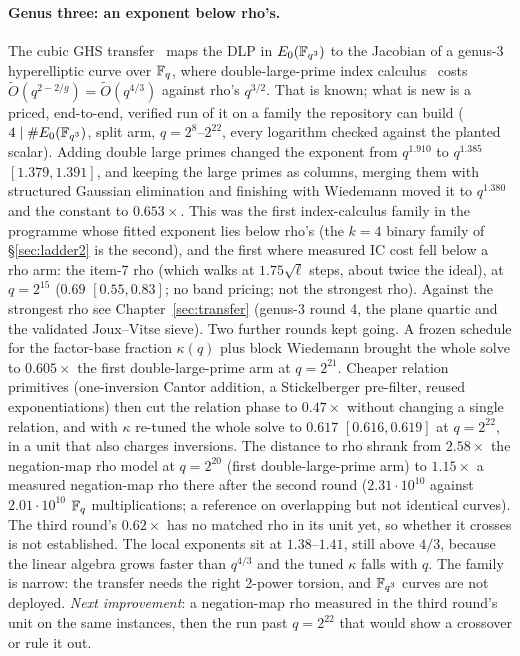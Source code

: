 \paragraph{Genus three: an exponent below rho's.} The cubic GHS
transfer~\cite{ghs2002} maps the DLP in $E_0(\mathbb{F}_{q^3})$ to the Jacobian
of a genus-3 hyperelliptic curve over $\mathbb{F}_q$, where double-large-prime
index calculus~\cite{gtthd2007} costs $\tilde O(q^{2-2/g})=\tilde O(q^{4/3})$
against rho's $q^{3/2}$. That is known; what is new is a priced,
end-to-end, verified run of it on a family the repository can build
($4\mid\#E_0(\mathbb{F}_{q^3})$, split arm, $q=2^{8}$--$2^{22}$, every logarithm checked
against the planted scalar). Adding double large primes changed the
exponent from $q^{1.910}$ to $q^{1.385}$ $[1.379,1.391]$, and keeping the large
primes as columns, merging them with structured Gaussian elimination and
finishing with Wiedemann moved it to $q^{1.380}$ and the constant to
$0.653\times$. This was the first index-calculus family in the programme whose fitted
exponent lies below rho's (the $k=4$ binary family of \S\ref{sec:ladder2}
is the second), and the first where measured IC cost fell below a rho arm:
the item-7 rho (which walks at $1.75\sqrt\ell$ steps, about twice the
ideal), at $q=2^{15}$ ($0.69$ $[0.55,0.83]$; no band pricing; not the
strongest rho). Against the strongest rho see Chapter~\ref{sec:transfer}
(genus-3 round 4, the plane quartic and the validated Joux--Vitse sieve). Two further
rounds kept going. A frozen schedule for the factor-base fraction $\kappa(q)$
plus block Wiedemann brought the whole solve to $0.605\times$ the first
double-large-prime arm at $q=2^{21}$. Cheaper relation primitives
(one-inversion Cantor addition, a Stickelberger pre-filter, reused
exponentiations) then cut the relation phase to $0.47\times$ without
changing a single relation, and with $\kappa$ re-tuned the whole solve to
$0.617$ $[0.616,0.619]$ at $q=2^{22}$, in a unit that also charges
inversions. The distance to rho shrank from $2.58\times$ the negation-map
rho model at $q=2^{20}$ (first double-large-prime arm) to $1.15\times$ a
measured negation-map rho there after the second round ($2.31\cdot10^{10}$
against $2.01\cdot10^{10}$ $\mathbb{F}_q$ multiplications; a reference on
overlapping but not identical curves). The third round's $0.62\times$
has no matched rho in its unit yet, so whether it crosses is not
established. The local exponents sit at $1.38$--$1.41$, still above $4/3$,
because the linear algebra grows faster than $q^{4/3}$ and the tuned
$\kappa$ falls with $q$. The family is narrow: the transfer needs the
right 2-power torsion, and $\mathbb{F}_{q^3}$ curves are not deployed.
\emph{Next improvement}: a negation-map rho measured in the third round's
unit on the same instances, then the run past $q=2^{22}$ that would show a
crossover or rule it out.

